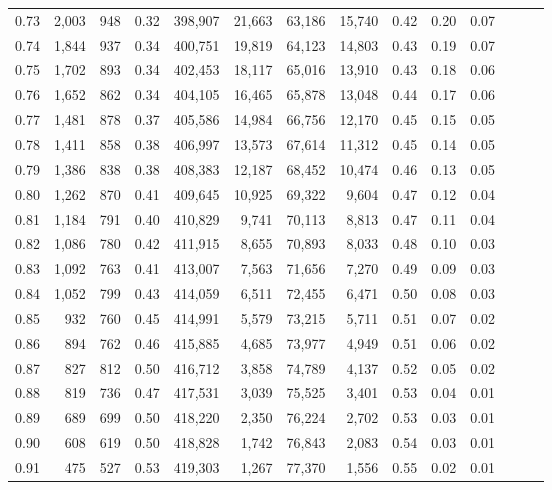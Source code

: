 \begin{tabular}{rrrrrrrrrrrrrr}
0.73 &  2,003 &    948 &  0.32 &  398,907 &   21,663 &  63,186 &  15,740 &  0.42 &  0.20 &      0.07 \\
0.74 &  1,844 &    937 &  0.34 &  400,751 &   19,819 &  64,123 &  14,803 &  0.43 &  0.19 &      0.07 \\
0.75 &  1,702 &    893 &  0.34 &  402,453 &   18,117 &  65,016 &  13,910 &  0.43 &  0.18 &      0.06 \\
0.76 &  1,652 &    862 &  0.34 &  404,105 &   16,465 &  65,878 &  13,048 &  0.44 &  0.17 &      0.06 \\
0.77 &  1,481 &    878 &  0.37 &  405,586 &   14,984 &  66,756 &  12,170 &  0.45 &  0.15 &      0.05 \\
0.78 &  1,411 &    858 &  0.38 &  406,997 &   13,573 &  67,614 &  11,312 &  0.45 &  0.14 &      0.05 \\
0.79 &  1,386 &    838 &  0.38 &  408,383 &   12,187 &  68,452 &  10,474 &  0.46 &  0.13 &      0.05 \\
0.80 &  1,262 &    870 &  0.41 &  409,645 &   10,925 &  69,322 &   9,604 &  0.47 &  0.12 &      0.04 \\
0.81 &  1,184 &    791 &  0.40 &  410,829 &    9,741 &  70,113 &   8,813 &  0.47 &  0.11 &      0.04 \\
0.82 &  1,086 &    780 &  0.42 &  411,915 &    8,655 &  70,893 &   8,033 &  0.48 &  0.10 &      0.03 \\
0.83 &  1,092 &    763 &  0.41 &  413,007 &    7,563 &  71,656 &   7,270 &  0.49 &  0.09 &      0.03 \\
0.84 &  1,052 &    799 &  0.43 &  414,059 &    6,511 &  72,455 &   6,471 &  0.50 &  0.08 &      0.03 \\
0.85 &    932 &    760 &  0.45 &  414,991 &    5,579 &  73,215 &   5,711 &  0.51 &  0.07 &      0.02 \\
0.86 &    894 &    762 &  0.46 &  415,885 &    4,685 &  73,977 &   4,949 &  0.51 &  0.06 &      0.02 \\
0.87 &    827 &    812 &  0.50 &  416,712 &    3,858 &  74,789 &   4,137 &  0.52 &  0.05 &      0.02 \\
0.88 &    819 &    736 &  0.47 &  417,531 &    3,039 &  75,525 &   3,401 &  0.53 &  0.04 &      0.01 \\
0.89 &    689 &    699 &  0.50 &  418,220 &    2,350 &  76,224 &   2,702 &  0.53 &  0.03 &      0.01 \\
0.90 &    608 &    619 &  0.50 &  418,828 &    1,742 &  76,843 &   2,083 &  0.54 &  0.03 &      0.01 \\
0.91 &    475 &    527 &  0.53 &  419,303 &    1,267 &  77,370 &   1,556 &  0.55 &  0.02 &      0.01 \\

\end{tabular}
